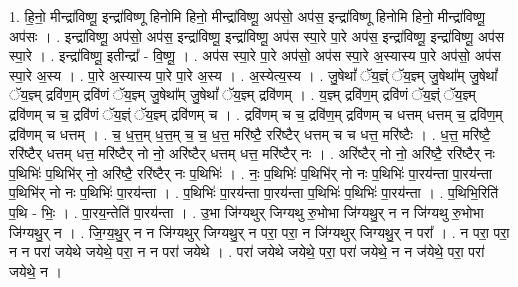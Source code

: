 \documentclass[17pt]{extarticle}
\begin{document}
1. हि॒नो॒ मीन्द्रा॑विष्णू॒ इन्द्रा॑विष्णू हिनोमि हिनो॒ मीन्द्रा॑विष्णू॒ अप॑सो॒ अप॑स॒ इन्द्रा॑विष्णू हिनोमि हिनो॒ मीन्द्रा॑विष्णू॒ अप॑सः । . इन्द्रा॑विष्णू॒ अप॑सो॒ अप॑स॒ इन्द्रा॑विष्णू॒ इन्द्रा॑विष्णू॒ अप॑स स्पा॒रे पा॒रे अप॑स॒ इन्द्रा॑विष्णू॒ इन्द्रा॑विष्णू॒ अप॑स स्पा॒रे । . इन्द्रा॑विष्णू॒ इतीन्द्रा᳚ - वि॒ष्णू॒ । . अप॑स स्पा॒रे पा॒रे अप॑सो॒ अप॑स स्पा॒रे अ॒स्यास्य पा॒रे अप॑सो॒ अप॑स स्पा॒रे अ॒स्य । . पा॒रे अ॒स्यास्य पा॒रे पा॒रे अ॒स्य । . अ॒स्येत्य॒स्य । . जु॒षेथां᳚ ॅय॒ज्ञ्ं ॅय॒ज्ञ्म् जु॒षेथा᳚म् जु॒षेथां᳚ ॅय॒ज्ञ्म् द्रवि॑ण॒म् द्रवि॑णं ॅय॒ज्ञ्म् जु॒षेथा᳚म् जु॒षेथां᳚ ॅय॒ज्ञ्म् द्रवि॑णम् । . य॒ज्ञ्म् द्रवि॑ण॒म् द्रवि॑णं ॅय॒ज्ञ्ं ॅय॒ज्ञ्म् द्रवि॑णम् च च॒ द्रवि॑णं ॅय॒ज्ञ्ं ॅय॒ज्ञ्म् द्रवि॑णम् च । . द्रवि॑णम् च च॒ द्रवि॑ण॒म् द्रवि॑णम् च धत्तम् धत्तम् च॒ द्रवि॑ण॒म् द्रवि॑णम् च धत्तम् । . च॒ ध॒त्त॒म् ध॒त्त॒म् च॒ च॒ ध॒त्त॒ मरि॑ष्टै॒ ररि॑ष्टैर् धत्तम् च च धत्त॒ मरि॑ष्टैः । . ध॒त्त॒ मरि॑ष्टै॒ ररि॑ष्टैर् धत्तम् धत्त॒ मरि॑ष्टैर् नो नो॒ अरि॑ष्टैर् धत्तम् धत्त॒ मरि॑ष्टैर् नः । . अरि॑ष्टैर् नो नो॒ अरि॑ष्टै॒ ररि॑ष्टैर् नः प॒थिभिः॑ प॒थिभि॑र् नो॒ अरि॑ष्टै॒ ररि॑ष्टैर् नः प॒थिभिः॑ । . नः॒ प॒थिभिः॑ प॒थिभि॑र् नो नः प॒थिभिः॑ पा॒रय॑न्ता पा॒रय॑न्ता प॒थिभि॑र् नो नः प॒थिभिः॑ पा॒रय॑न्ता । . प॒थिभिः॑ पा॒रय॑न्ता पा॒रय॑न्ता प॒थिभिः॑ प॒थिभिः॑ पा॒रय॑न्ता । . प॒थिभि॒रिति॑ प॒थि - भिः॒ । . पा॒रय॒न्तेति॑ पा॒रय॑न्ता । . उ॒भा जि॑ग्यथुर् जिग्यथु रु॒भोभा जि॑ग्यथु॒र् न न जि॑ग्यथु रु॒भोभा जि॑ग्यथु॒र् न । . जि॒ग्य॒थु॒र् न न जि॑ग्यथुर् जिग्यथु॒र् न परा॒ परा॒ न जि॑ग्यथुर् जिग्यथु॒र् न परा᳚ । . न परा॒ परा॒ न न परा॑ जयेथे जयेथे॒ परा॒ न न परा॑ जयेथे । . परा॑ जयेथे जयेथे॒ परा॒ परा॑ जयेथे॒ न न ज॑येथे॒ परा॒ परा॑ जयेथे॒ न । \newline
\end{document}
